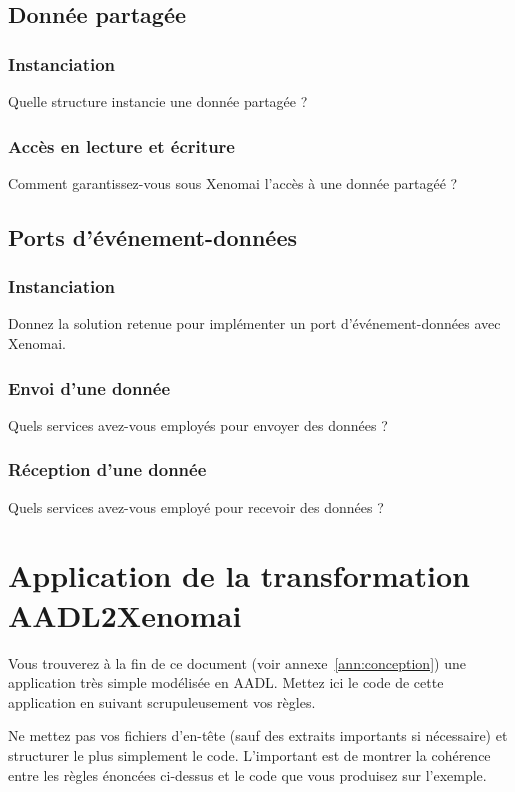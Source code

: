 \documentclass[11pt, a4paper]{paper}
\begin{document}
\subsection{Donnée partagée}

\subsubsection{Instanciation}
 {\color{blue} Quelle structure instancie une donnée partagée ?}

\subsubsection{Accès en lecture et écriture}
 {\color{blue} Comment garantissez-vous sous Xenomai l'accès à une donnée partagéé ?}

\subsection{Ports d’événement-données}

\subsubsection{Instanciation}
 {\color{blue} Donnez la solution retenue pour implémenter un port d'événement-données avec Xenomai.}

\subsubsection{Envoi d’une donnée}
 {\color{blue} Quels services avez-vous employés pour envoyer des données ?}

\subsubsection{Réception d’une donnée}
 {\color{blue} Quels services avez-vous employé pour recevoir des données ?}

\section{Application de la transformation AADL2Xenomai}

{\color{blue} Vous trouverez à la fin de ce document (voir annexe~\ref{ann:conception}) une application très simple modélisée en AADL. Mettez ici le code de cette application en suivant scrupuleusement vos règles.

Ne mettez pas vos fichiers d'en-tête (sauf des extraits importants si nécessaire) et structurer le plus simplement le code. L'important est de montrer la cohérence entre les règles énoncées ci-dessus et le code que vous produisez sur l'exemple.}
\end{document}
